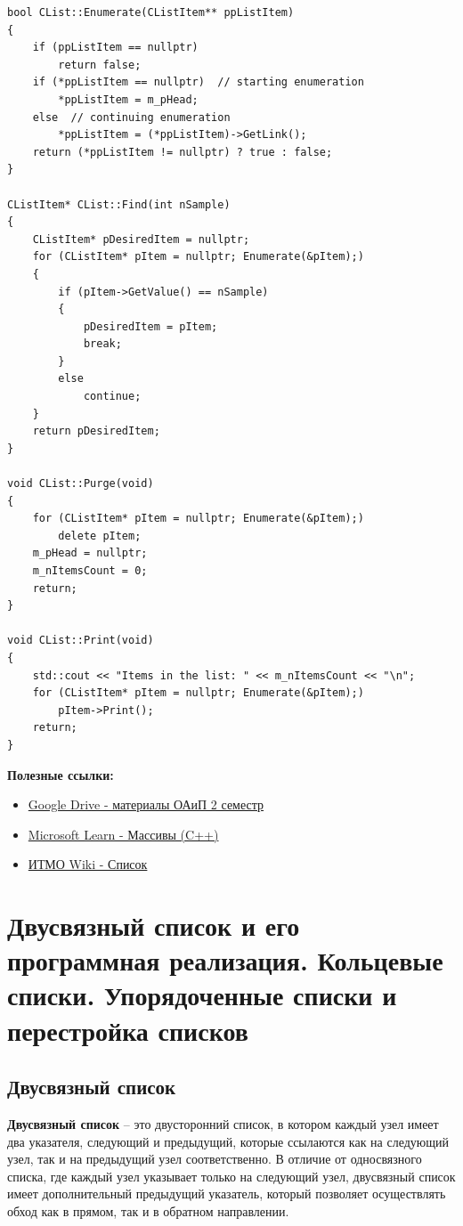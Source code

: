 \begin{verbatim}
bool CList::Enumerate(CListItem** ppListItem)
{
    if (ppListItem == nullptr)
        return false;
    if (*ppListItem == nullptr)  // starting enumeration
        *ppListItem = m_pHead;
    else  // continuing enumeration
        *ppListItem = (*ppListItem)->GetLink();
    return (*ppListItem != nullptr) ? true : false;
}

CListItem* CList::Find(int nSample)
{
    CListItem* pDesiredItem = nullptr;
    for (CListItem* pItem = nullptr; Enumerate(&pItem);)
    {
        if (pItem->GetValue() == nSample)
        {
            pDesiredItem = pItem;
            break;
        }
        else
            continue;
    }
    return pDesiredItem;
}

void CList::Purge(void)
{
    for (CListItem* pItem = nullptr; Enumerate(&pItem);)
        delete pItem;
    m_pHead = nullptr;
    m_nItemsCount = 0;
    return;
}

void CList::Print(void)
{
    std::cout << "Items in the list: " << m_nItemsCount << "\n";
    for (CListItem* pItem = nullptr; Enumerate(&pItem);)
        pItem->Print();
    return;
}
\end{verbatim}

\textbf{Полезные ссылки:}
\begin{itemize}
    \item \href{https://drive.google.com/drive/folders/1EClc2YdBxoKuk4g1VPfmMlzmHIsJwC35}{Google Drive - материалы ОАиП 2 семестр}
    \item \href{https://learn.microsoft.com/ru-ru/cpp/cpp/arrays-cpp?view=msvc-170}{Microsoft Learn - Массивы (C++)}
    \item \href{https://neerc.ifmo.ru/wiki/index.php?title=%D0%A1%D0%BF%D0%B8%D1%81%D0%BE%D0%BA}{ИТМО Wiki - Список}
\end{itemize}

\section{Двусвязный список и его программная реализация. Кольцевые списки.  Упорядоченные списки и перестройка списков}

\subsection{Двусвязный список}

\textbf{Двусвязный список} -- это двусторонний список, в котором каждый узел имеет два указателя, следующий и предыдущий, которые ссылаются как на следующий узел, так и на предыдущий узел соответственно. В отличие от односвязного списка, где каждый узел указывает только на следующий узел, двусвязный список имеет дополнительный предыдущий указатель, который позволяет осуществлять обход как в прямом, так и в обратном направлении.

